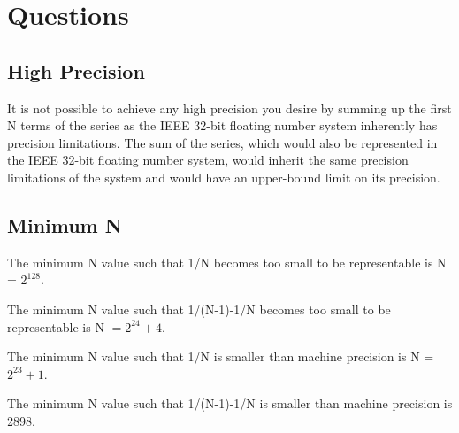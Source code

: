 \section{Questions}

\subsection[q4a]{High Precision}
It is not possible to achieve any high precision you desire by summing up the first N terms of the series as the IEEE 32-bit floating number system inherently has precision limitations. The sum of the series, which would also be represented in the IEEE 32-bit floating number system, would inherit the same precision limitations of the system and would have an upper-bound limit on its precision.

\subsection[q4b]{Minimum N}
The minimum N value such that 1/N becomes too small to be representable is N = $2^{128}$. 

The minimum N value such that 1/(N-1)-1/N becomes too small to be representable is N $= 2^{24}+4$. 

The minimum N value such that 1/N is smaller than machine precision is N = $2^{23}+1$.

The minimum N value such that 1/(N-1)-1/N is smaller than machine precision is 2898.



